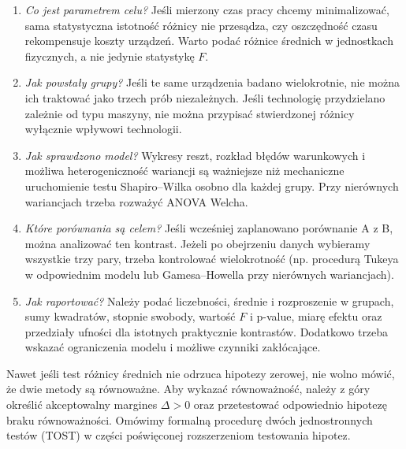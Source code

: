\begin{enumerate}
\item \emph{Co jest parametrem celu?} Jeśli mierzony czas
pracy chcemy minimalizować, sama statystyczna istotność
różnicy nie przesądza, czy oszczędność czasu rekompensuje
koszty urządzeń. Warto podać różnice średnich w jednostkach
fizycznych, a nie jedynie statystykę $F$.
\item \emph{Jak powstały grupy?} Jeśli te same urządzenia
badano wielokrotnie, nie można ich traktować jako trzech
prób niezależnych. Jeśli technologię przydzielano zależnie
od typu maszyny, nie można przypisać stwierdzonej różnicy
wyłącznie wpływowi technologii.
\item \emph{Jak sprawdzono model?} Wykresy reszt, rozkład
błędów warunkowych i możliwa heterogeniczność wariancji
są ważniejsze niż mechaniczne uruchomienie testu
Shapiro--Wilka osobno dla każdej grupy. Przy nierównych
wariancjach trzeba rozważyć ANOVA Welcha.
\item \emph{Które porównania są celem?} Jeśli wcześniej
zaplanowano porównanie A z B, można analizować ten kontrast.
Jeżeli po obejrzeniu danych wybieramy wszystkie trzy pary,
trzeba kontrolować wielokrotność (np. procedurą Tukeya
w odpowiednim modelu lub Gamesa--Howella przy nierównych
wariancjach).
\item \emph{Jak raportować?} Należy podać liczebności,
średnie i rozproszenie w grupach, sumy kwadratów, stopnie
swobody, wartość $F$ i p-value, miarę efektu oraz
przedziały ufności dla istotnych praktycznie kontrastów.
Dodatkowo trzeba wskazać ograniczenia modelu i możliwe
czynniki zakłócające.
\end{enumerate}

\begin{uwaga}
Nawet jeśli test różnicy średnich nie odrzuca hipotezy
zerowej, nie wolno mówić, że dwie metody są równoważne.
Aby wykazać równoważność, należy z góry określić
akceptowalny margines $\Delta>0$ oraz przetestować
odpowiednio hipotezę braku równoważności. Omówimy
formalną procedurę dwóch jednostronnych testów (TOST)
w części poświęconej rozszerzeniom testowania hipotez.
\end{uwaga}



